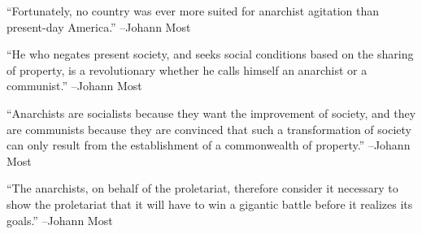 \documentclass{article}%
\begin{document}
\linebreak%
\vspace{1mm}%
\begin{minipage}{\textwidth}%
\flushleft%
“Fortunately, no country was ever more suited for anarchist agitation than present{-}day America.”%
\linebreak%
\vspace{1mm}%
–Johann Most%
\linebreak%
\vspace{1mm}%
\end{minipage}%
\linebreak%
\vspace{1mm}%
\begin{minipage}{\textwidth}%
\flushleft%
“He who negates present society, and seeks social conditions based on the sharing of property, is a revolutionary whether he calls himself an anarchist or a communist.”%
\linebreak%
\vspace{1mm}%
–Johann Most%
\linebreak%
\vspace{1mm}%
\end{minipage}%
\linebreak%
\vspace{1mm}%
\begin{minipage}{\textwidth}%
\flushleft%
“Anarchists are socialists because they want the improvement of society, and they are communists because they are convinced that such a transformation of society can only result from the establishment of a commonwealth of property.”%
\linebreak%
\vspace{1mm}%
–Johann Most%
\linebreak%
\vspace{1mm}%
\end{minipage}%
\linebreak%
\vspace{1mm}%
\begin{minipage}{\textwidth}%
\flushleft%
“The anarchists, on behalf of the proletariat, therefore consider it necessary to show the proletariat that it will have to win a gigantic battle before it realizes its goals.”%
\linebreak%
\vspace{1mm}%
–Johann Most%
\linebreak%
\vspace{1mm}%
\end{minipage}%
\linebreak%
\end{document}
